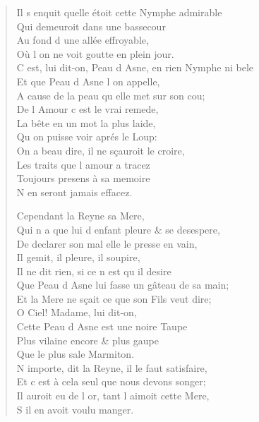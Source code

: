 \documentclass[14pt,a4paper]{memoir}
\begin{document}
{{\begin{otherlanguage}{french}
\begin{verse}
Il s\textquotesingle{} enquit quelle étoit cette Nymphe admirable \\
\vin Qui demeuroit dans une bassecour \\
\vin Au fond d\textquotesingle{} une allée effroyable, \\
\vin Où l\textquotesingle{} on ne voit goutte en plein jour. \\
C\textquotesingle{} est, lui dit-on, Peau d\textquotesingle{} Asne, en rien Nymphe ni bele \\
\vin Et que Peau d\textquotesingle{} Asne l\textquotesingle{} on appelle, \\
A cause de la peau qu\textquotesingle{} elle met sur son cou; \\
\vin De l\textquotesingle{} Amour c\textquotesingle{} est le vrai remede, \\
\vin La bête en un mot la plus laide, \\
\vin Qu\textquotesingle{} on puisse voir aprés le Loup: \\
\vin On a beau dire, il ne sçauroit le croire, \\
\vin Les traits que l\textquotesingle{} amour a tracez \\
\vin Toujours presens à sa memoire \\
\vin N\textquotesingle{} en seront jamais effacez.

\vin Cependant la Reyne sa Mere, \\
Qui n\textquotesingle{} a que lui d\textquotesingle{} enfant pleure \& se desespere, \\
De declarer son mal elle le presse en vain, \\
\vin Il gemit, il pleure, il soupire, \\
\vin Il ne dit rien, si ce n\textquotesingle{} est qu\textquotesingle{} il desire \\
Que Peau d\textquotesingle{} Asne lui fasse un gâteau de sa main; \\
Et la Mere ne sçait ce que son Fils veut dire; \\
\vin O Ciel! Madame, lui dit-on, \\
\vin Cette Peau d\textquotesingle{} Asne est une noire Taupe \\
\vin Plus vilaine encore \& plus gaupe \\
\vin Que le plus sale Marmiton. \\
N\textquotesingle{} importe, dit la Reyne, il le faut satisfaire, \\
Et c\textquotesingle{} est à cela seul que nous devons songer; \\
Il auroit eu de l\textquotesingle{} or, tant l\textquotesingle{} aimoit cette Mere, \\
\vin S\textquotesingle{} il en avoit voulu manger.


\end{verse}
\end{otherlanguage}}}
\end{document}
